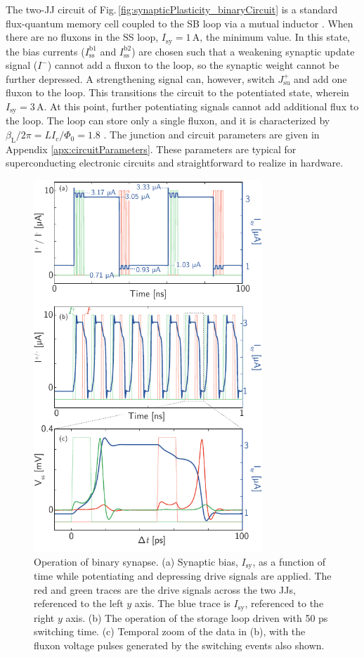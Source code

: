 \documentclass[twocolumn]{article}
\begin{document}
The two-JJ circuit of Fig.\,\ref{fig:synapticPlasticity_binaryCircuit} is a standard flux-quantum memory cell \cite{ka1999,vatu1998} coupled to the SB loop via a mutual inductor \cite{miha2005}. When there are no fluxons in the SS loop, $I_{\mathrm{sy}} = 1$\,\textmu A, the minimum value. In this state, the bias currents ($I^{\mathrm{b1}}_{\mathrm{ss}}$ and $I^{\mathrm{b2}}_{\mathrm{ss}}$) are chosen such that a weakening synaptic update signal ($I^-$) cannot add a fluxon to the loop, so the synaptic weight cannot be further depressed. A strengthening signal can, however, switch $J_{\mathrm{su}}^+$ and add one fluxon to the loop. This transitions the circuit to the potentiated state, wherein $I_{\mathrm{sy}} = 3$\,\textmu A. At this point, further potentiating signals cannot add additional flux to the loop. The loop can store only a single fluxon, and it is characterized by $\beta_{\mathrm{L}}/2\pi = L I_c/\Phi_0 = 1.8$ \cite{ka1999,vatu1998}. The junction and circuit parameters are given in Appendix \ref{apx:circuitParameters}. These parameters are typical for superconducting electronic circuits and straightforward to realize in hardware.
\begin{figure}[t!]
	\centerline{\includegraphics[width=8.6cm]{_synapticPlasticity_binary_small.pdf}}
	\caption{\label{fig:synapticPlasticity_binary}Operation of binary synapse. (a) Synaptic bias, $I_{\mathrm{sy}}$, as a function of time while potentiating and depressing drive signals are applied. The red and green traces are the drive signals across the two JJs, referenced to the left $y$ axis. The blue trace is $I_{\mathrm{sy}}$, referenced to the right $y$ axis. (b) The operation of the storage loop driven with 50 ps switching time. (c) Temporal zoom of the data in (b), with the fluxon voltage pulses generated by the switching events also shown.}
\end{figure}
\end{document}
